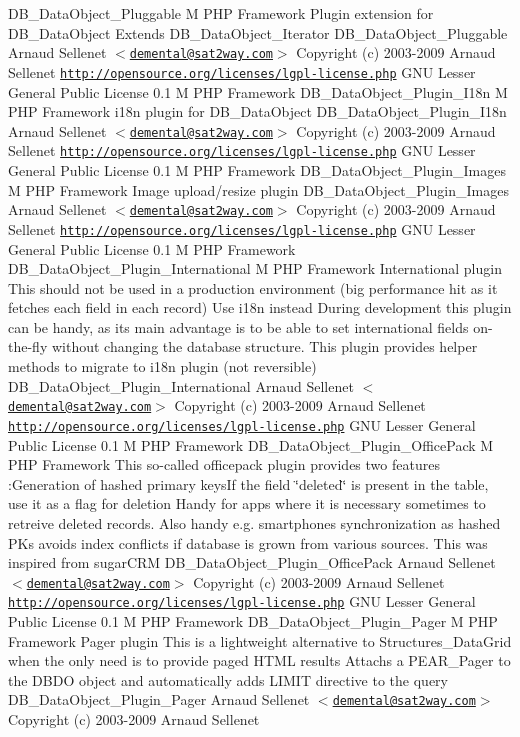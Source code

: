 \begin{Desc}
DB\_\-DataObject\_\-Pluggable  M PHP Framework  Plugin extension for DB\_\-DataObject Extends DB\_\-DataObject\_\-Iterator   DB\_\-DataObject\_\-Pluggable  Arnaud Sellenet $<$\href{mailto:demental@sat2way.com}{\tt demental@sat2way.com}$>$  Copyright (c) 2003-2009 Arnaud Sellenet  \href{http://opensource.org/licenses/lgpl-license.php}{\tt http://opensource.org/licenses/lgpl-license.php} GNU Lesser General Public License  0.1  M PHP Framework   DB\_\-DataObject\_\-Plugin\_\-I18n  M PHP Framework  i18n plugin for DB\_\-DataObject   DB\_\-DataObject\_\-Plugin\_\-I18n  Arnaud Sellenet $<$\href{mailto:demental@sat2way.com}{\tt demental@sat2way.com}$>$  Copyright (c) 2003-2009 Arnaud Sellenet  \href{http://opensource.org/licenses/lgpl-license.php}{\tt http://opensource.org/licenses/lgpl-license.php} GNU Lesser General Public License  0.1  M PHP Framework   DB\_\-DataObject\_\-Plugin\_\-Images  M PHP Framework  Image upload/resize plugin   DB\_\-DataObject\_\-Plugin\_\-Images  Arnaud Sellenet $<$\href{mailto:demental@sat2way.com}{\tt demental@sat2way.com}$>$  Copyright (c) 2003-2009 Arnaud Sellenet  \href{http://opensource.org/licenses/lgpl-license.php}{\tt http://opensource.org/licenses/lgpl-license.php} GNU Lesser General Public License  0.1  M PHP Framework   DB\_\-DataObject\_\-Plugin\_\-International  M PHP Framework  International plugin This should not be used in a production environment (big performance hit as it fetches each field in each record) Use i18n instead During development this plugin can be handy, as its main advantage is to be able to set international fields on-the-fly without changing the database structure. This plugin provides helper methods to migrate to i18n plugin (not reversible)   DB\_\-DataObject\_\-Plugin\_\-International  Arnaud Sellenet $<$\href{mailto:demental@sat2way.com}{\tt demental@sat2way.com}$>$  Copyright (c) 2003-2009 Arnaud Sellenet  \href{http://opensource.org/licenses/lgpl-license.php}{\tt http://opensource.org/licenses/lgpl-license.php} GNU Lesser General Public License  0.1  M PHP Framework   DB\_\-DataObject\_\-Plugin\_\-OfficePack  M PHP Framework  This so-called officepack plugin provides two features :Generation of hashed primary keysIf the field \char`\"{}deleted\char`\"{} is present in the table, use it as a flag for deletion Handy for apps where it is necessary sometimes to retreive deleted records. Also handy e.g. smartphones synchronization as hashed PKs avoids index conflicts if database is grown from various sources. This was inspired from sugarCRM   DB\_\-DataObject\_\-Plugin\_\-OfficePack  Arnaud Sellenet $<$\href{mailto:demental@sat2way.com}{\tt demental@sat2way.com}$>$  Copyright (c) 2003-2009 Arnaud Sellenet  \href{http://opensource.org/licenses/lgpl-license.php}{\tt http://opensource.org/licenses/lgpl-license.php} GNU Lesser General Public License  0.1  M PHP Framework   DB\_\-DataObject\_\-Plugin\_\-Pager  M PHP Framework  Pager plugin This is a lightweight alternative to Structures\_\-DataGrid when the only need is to provide paged HTML results Attachs a PEAR\_\-Pager to the DBDO object and automatically adds LIMIT directive to the query   DB\_\-DataObject\_\-Plugin\_\-Pager  Arnaud Sellenet $<$\href{mailto:demental@sat2way.com}{\tt demental@sat2way.com}$>$  Copyright (c) 2003-2009 Arnaud Sellenet  
\end{Desc}

